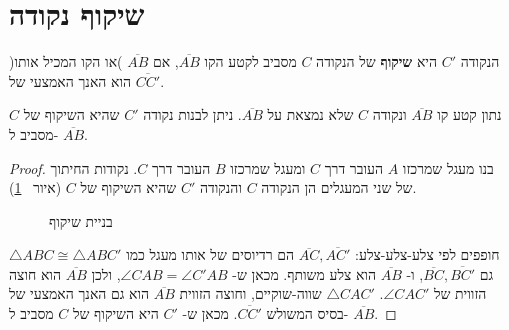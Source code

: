 
\section{שיקוף נקודה}\label{s.reflection}

\begin{definition}
הנקודה
$C'$
היא
\textbf{%
שיקוף%
}
של הנקודה
$C$
מסביב לקטע הקו
$\overline{AB}$,
אם 
$\overline{AB}$
)או הקו המכיל אותו( הוא האנך האמצעי של
$\overline{CC'}$.
\end{definition}
\begin{theorem}\label{thm.reflection}
נתון קטע קו
$\overline{AB}$
ונקודה 
$C$
שלא נמצאת על
$\overline{AB}$.
ניתן לבנות נקודה 
$C'$
שהיא השיקוף של
$C$
מסביב ל-%
$\overline{AB}$.
\end{theorem}

\begin{proof}
בנו מעגל שמרכזו
$A$
העובר דרך
$C$
ומעגל שמרכזו
$B$
העובר דרך
$C$.
נקודות החיתוך של שני המעגלים הן הנקודה
$C$
והנקודה
$C'$
שהיא השיקוף של
$C$
(איור%
~\ref{f.compass-reflection}).
\begin{figure}[htb]
\begin{center}
\caption{בניית שיקוף}\label{f.compass-reflection}
\end{center}
\end{figure}

$\triangle ABC\cong\triangle ABC'$
חופפים לפי צלע-צלע-צלע:
$\overline{AC},\overline{AC'}$
הם רדיוסים של אותו מעגל כמו גם
$\overline{BC},\overline{BC'}$,
ו-%
$\overline{AB}$
הוא צלע משותף. מכאן ש-%
$\angle CAB = \angle C'AB$,
ולכן
$\overline{AB}$
הוא חוצה הזווית של
$\angle CAC'$.
$\triangle CAC'$
שווה-שוקיים, וחוצה הזווית
$\overline{AB}$
הוא גם האנך האמצעי של בסיס המשולש
$\overline{CC'}$.
מכאן ש-%
$C'$
היא השיקוף של
$C$
מסביב ל-%
$\overline{AB}$.
\end{proof}

